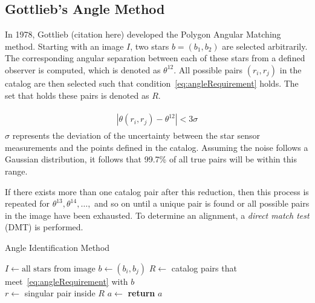 \subsection{Gottlieb's Angle Method}\label{subsec:gottlieb'sAngleMethod}
In 1978, Gottlieb (citation here) developed the Polygon Angular Matching method. Starting with an image $I$, two stars
$b = (b_1, b_2)$ are selected arbitrarily. The corresponding angular separation between each of these stars from a
defined observer is computed, which is denoted as $\theta^{12}$. All possible pairs $(r_i, r_j)$ in the catalog are then
selected such that condition~\eqref{eq:angleRequirement} holds. The set that holds these pairs is denoted as $R$.

\begin{align}
    \label{eq:angleRequirement}
    \begin{split}
        | \theta(r_i, r_j) - \theta^{12} | < 3 \sigma
    \end{split}
\end{align}
$\sigma$ represents the deviation of the uncertainty between the star sensor measurements and the points defined in the
catalog. Assuming the noise follows a Gaussian distribution, it follows that 99.7\% of all true pairs will be within
this range.

If there exists more than one catalog pair after this reduction, then this process is repeated for
$\theta^{13}, \theta^{14}, \dots,$ and so on until a unique pair is found or all possible pairs in the image
have been exhausted. To determine an alignment, a \textit{direct match test} (DMT) is performed.

\begin{algorithm}
    \caption{Angle Identification Method} \label{algorithm:angleIdentification}
    \begin{algorithmic}[1]
        \State $I \gets \text{all stars} \text{ from image}$
        \State $b \gets (b_i, b_j)$
        \State $R \gets $ catalog pairs that meet~\eqref{eq:angleRequirement} with $b$
        \\
        \State $r \gets $ singular pair inside $R$
        \State $a \gets $ 
        \State \textbf{return} $a$
        \EndIf
        \EndFor
        \EndFor
        \EndProcedure
    \end{algorithmic}
\end{algorithm}

